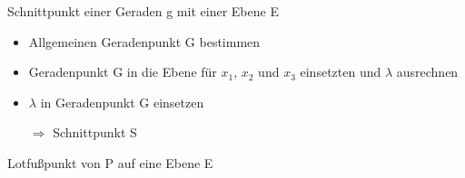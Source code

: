 \documentclass[paper=a6,landscape,ngerman,twoside=true,fontsize=12pt]{scrartcl}
\begin{document}
\begin{frage}
	Schnittpunkt einer Geraden g mit einer Ebene E
	
\end{frage}
\begin{antwort}
	\begin{itemize} 
		\item Allgemeinen Geradenpunkt G bestimmen
		\item Geradenpunkt G in die Ebene für $x_1$, $x_2$ und $x_3$ einsetzten und $\lambda$ ausrechnen
		\item $\lambda$ in Geradenpunkt G einsetzen
		
		 $\Rightarrow$ Schnittpunkt S
	\end{itemize}
	
\end{antwort}
\begin{frage}
	Lotfußpunkt von P auf eine Ebene E
	
\end{frage}
\end{document}
